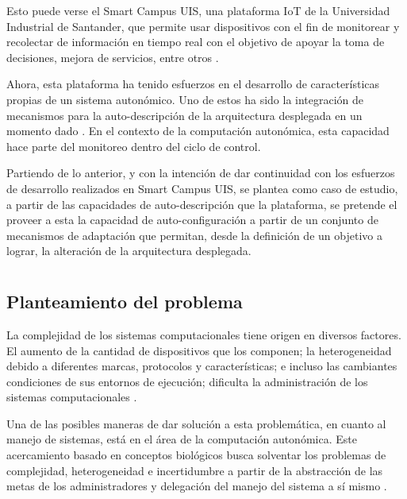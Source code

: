 \documentclass[12pt]{article}
\begin{document}
    Esto puede verse el Smart Campus UIS, una plataforma IoT de la Universidad Industrial de Santander, que permite usar dispositivos con el fin de monitorear y recolectar de información en tiempo real con el objetivo de apoyar la toma de decisiones, mejora de servicios, entre otros \cite{henry_2020}.

    Ahora, esta plataforma ha tenido esfuerzos en el desarrollo de características propias de un sistema autonómico. Uno de estos ha sido la integración de mecanismos para la auto-descripción de la arquitectura desplegada en un momento dado \cite{msc_henry_2022}. En el contexto de la computación autonómica, esta capacidad hace parte del monitoreo dentro del ciclo de control. 

    Partiendo de lo anterior, y con la intención de dar continuidad con los esfuerzos de desarrollo realizados en Smart Campus UIS, se plantea como caso de estudio, a partir de las capacidades de auto-descripción que la plataforma, se pretende el proveer a esta la capacidad de auto-configuración a partir de un conjunto de mecanismos de adaptación que permitan, desde la definición de un objetivo a lograr, la alteración de la arquitectura desplegada. 

    \section{\tit}
    
    \subsection{Planteamiento del problema}

    La complejidad de los sistemas computacionales tiene origen en diversos factores. El aumento de la cantidad de dispositivos que los componen; la heterogeneidad debido a diferentes marcas, protocolos y características; e incluso las cambiantes condiciones de sus entornos de ejecución; dificulta la administración de los sistemas computacionales \cite{emerging_2005}.
 
    Una de las posibles maneras de dar solución a esta problemática, en cuanto al manejo de sistemas, está en el área de la computación autonómica. Este acercamiento basado en conceptos biológicos busca solventar los problemas de complejidad, heterogeneidad e incertidumbre \cite{emerging_2005} a partir de la abstracción de las metas de los administradores y delegación del manejo del sistema a sí mismo \cite{lalanda_diaconescu_mccann_2014}.
\end{document}
